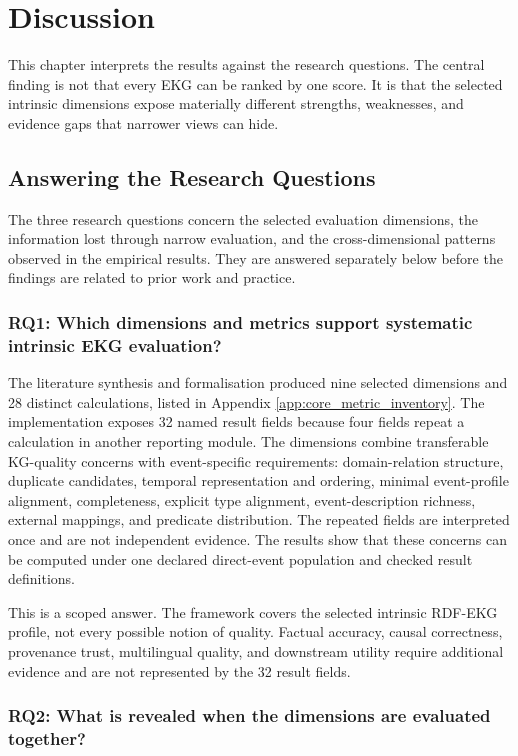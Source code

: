 \chapter{Discussion}

This chapter interprets the results against the research questions. The central finding is not that every EKG can be ranked by one score. It is that the selected intrinsic dimensions expose materially different strengths, weaknesses, and evidence gaps that narrower views can hide.

\section{Answering the Research Questions}

The three research questions concern the selected evaluation dimensions, the information lost through narrow evaluation, and the cross-dimensional patterns observed in the empirical results. They are answered separately below before the findings are related to prior work and practice.

\subsection{RQ1: Which dimensions and metrics support systematic intrinsic EKG evaluation?}

The literature synthesis and formalisation produced nine selected dimensions and 28 distinct calculations, listed in Appendix \ref{app:core_metric_inventory}. The implementation exposes 32 named result fields because four fields repeat a calculation in another reporting module. The dimensions combine transferable KG-quality concerns with event-specific requirements: domain-relation structure, duplicate candidates, temporal representation and ordering, minimal event-profile alignment, completeness, explicit type alignment, event-description richness, external mappings, and predicate distribution. The repeated fields are interpreted once and are not independent evidence. The results show that these concerns can be computed under one declared direct-event population and checked result definitions.

This is a scoped answer. The framework covers the selected intrinsic RDF-EKG profile, not every possible notion of quality. Factual accuracy, causal correctness, provenance trust, multilingual quality, and downstream utility require additional evidence and are not represented by the 32 result fields.

\subsection{RQ2: What is revealed when the dimensions are evaluated together?}

